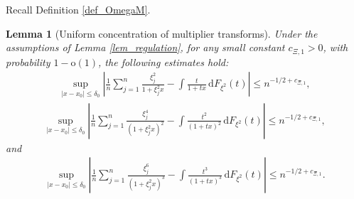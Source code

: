 \documentclass[12pt]{article}
\theoremstyle{plain}
\newtheorem{lemma}{Lemma}[section]
\numberwithin{equation}{section}
\begin{document}
Recall Definition \ref{def_OmegaM}.
\begin{lemma}[Uniform concentration of multiplier transforms]
	\label{lem_uniform_multiplier_concentration}
	Under the assumptions of Lemma \ref{lem_regulation}, for any  small constant
	$c_{\Xi,1}>0$, with probability $1-\mathrm{o}(1)$, the following estimates hold:
	\begin{align*}
		\sup_{|x-x_0|\le\delta_0}\left|\frac{1}{n}\sum_{j=1}^n \frac{\xi_j^2}{1+\xi_j^2x}-\int\frac{t}{1+tx}\,\mathrm{d}F_{\xi^2}(t) \right|\leq n^{-1/2+c_{\Xi,1}},
	\end{align*}
	\begin{align*}
		\sup_{|x-x_0|\le\delta_0}\left|\frac{1}{n}\sum_{j=1}^n\frac{\xi_j^4}{(1+\xi_j^2x)^2}-\int\frac{t^2}{(1+tx)^2}\,\mathrm{d}F_{\xi^2}(t)\right|\leq n^{-1/2+c_{\Xi,1}},
	\end{align*}
	and
	\begin{align*}
		\sup_{|x-x_0|\le\delta_0}\left|\frac{1}{n}\sum_{j=1}^n \frac{\xi_j^6}{(1+\xi_j^2x)^3}-\int\frac{t^3}{(1+tx)^3}\,\mathrm{d}F_{\xi^2}(t)\right|\leq n^{-1/2+c_{\Xi,1}}.
	\end{align*}
\end{lemma}
\end{document}
